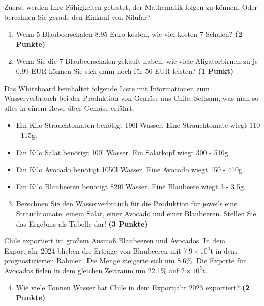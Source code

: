 \documentclass[a4paper, 9pt]{scrartcl}\usepackage[]{graphicx}\usepackage[]{xcolor}
\begin{document}
Zuerst werden Ihre Fähigkeiten getestet, der Mathematik folgen zu können. Oder berechnen Sie gerade den Einkauf von Nilufar?\\

\begin{enumerate}
\item Wenn 5 Blaubeerschalen 8.95 Euro kosten,  wie viel kosten 7 Schalen? \textbf{(2 Punkte)}
\item Wenn Sie die 7 Blaubeerschalen gekauft haben, wie viele Aligatorbirnen zu je 0.99 EUR können Sie sich dann noch für 50 EUR leisten? \textbf{(1 Punkt)}
\end{enumerate}

Das Whiteboard beinhaltet folgende Liste mit Informationen zum Wasserverbrauch bei der Produktion von Gemüse aus Chile. Seltsam, was man so alles in einem Rewe über Gemüse erfährt.
  
\begin{itemize}[noitemsep]
\item Ein Kilo Strauchtomaten benötigt 190l Wasser. Eine Strauchtomate wiegt 110 - 115g.
\item Ein Kilo Salat benötigt 100l Wasser. Ein Salatkopf wiegt 300 - 510g.
\item Ein Kilo Avocado benötigt 1050l Wasser. Eine Avocado wiegt 150 - 410g.
\item Ein Kilo Blaubeeren benötigt 820l Wasser. Eine Blaubeere wiegt 3 - 3.5g.
\end{itemize}

\begin{enumerate}
  \setcounter{enumi}{2}
\item Berechnen Sie den Wasserverbrauch für die Produktion für jeweils eine Strauchtomate, einem Salat, einer Avocado und einer Blaubeeren. Stellen Sie das Ergebnis als Tabelle dar! \textbf{(3 Punkte)}
\end{enumerate}

Chile exportiert im großem Ausmaß Blaubeeren und Avocados. In dem Exportjahr 2024 blieben die Erträge von Blaubeeren mit \ensuremath{7.9\times 10^{4}}t in dem prognostizierten Rahmen. Die Menge steigerte sich um 8.6\%. Die Exporte für Avocados fielen in dem gleichen Zeitraum um 22.1\% auf \ensuremath{2\times 10^{5}}t.

\begin{enumerate}
  \setcounter{enumi}{3}
\item Wie viele Tonnen Wasser hat Chile in dem Exportjahr 2023 exportiert? \textbf{(2 Punkte)}
\end{enumerate}
\end{document}
